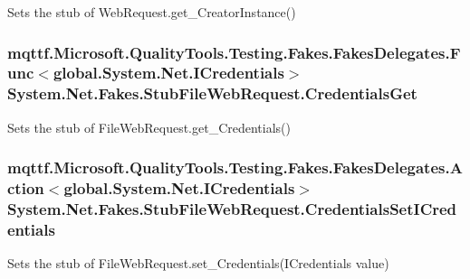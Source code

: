 Sets the stub of Web\-Request.\-get\-\_\-\-Creator\-Instance()

\hypertarget{class_system_1_1_net_1_1_fakes_1_1_stub_file_web_request_af34dcda5b992990cc44b3a84e5fe8253}{
\subsubsection[{Credentials\-Get}]{\setlength{\rightskip}{0pt plus 5cm}mqttf.\-Microsoft.\-Quality\-Tools.\-Testing.\-Fakes.\-Fakes\-Delegates.\-Func$<$global.\-System.\-Net.\-I\-Credentials$>$ System.\-Net.\-Fakes.\-Stub\-File\-Web\-Request.\-Credentials\-Get}}\label{class_system_1_1_net_1_1_fakes_1_1_stub_file_web_request_af34dcda5b992990cc44b3a84e5fe8253}


Sets the stub of File\-Web\-Request.\-get\-\_\-\-Credentials()

\hypertarget{class_system_1_1_net_1_1_fakes_1_1_stub_file_web_request_ad42c716e33bfd76511ec3fe3be5f6a88}{
\subsubsection[{Credentials\-Set\-I\-Credentials}]{\setlength{\rightskip}{0pt plus 5cm}mqttf.\-Microsoft.\-Quality\-Tools.\-Testing.\-Fakes.\-Fakes\-Delegates.\-Action$<$global.\-System.\-Net.\-I\-Credentials$>$ System.\-Net.\-Fakes.\-Stub\-File\-Web\-Request.\-Credentials\-Set\-I\-Credentials}}\label{class_system_1_1_net_1_1_fakes_1_1_stub_file_web_request_ad42c716e33bfd76511ec3fe3be5f6a88}


Sets the stub of File\-Web\-Request.\-set\-\_\-\-Credentials(\-I\-Credentials value)

